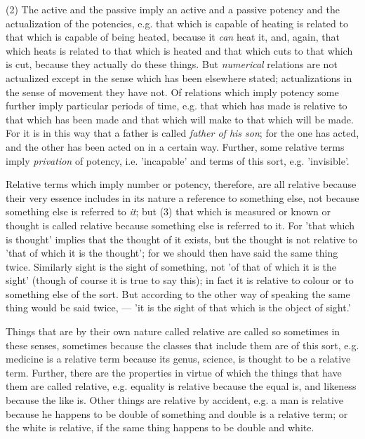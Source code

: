 (2) The active and the passive imply an active and a passive potency and the actualization of the potencies, e.g. that which is capable of heating is related to that which is capable of being heated, because it \emph{can} heat it, and, again, that which heats is related to that which is heated and that which cuts to that which is cut, because they actually do these things. But \emph{numerical} relations are not actualized except in the sense which has been elsewhere stated; actualizations in the sense of movement they have not. Of relations which imply potency some further imply particular periods of time, e.g. that which has made is relative to that which has been made and that which will make to that which will be made. For it is in this way that a father is called \emph{father of his son}; for the one has acted, and the other has been acted on in a certain way. Further, some relative terms imply \emph{privation} of potency, i.e. 'incapable' and terms of this sort, e.g. 'invisible'.

Relative terms which imply number or potency, therefore, are all relative because their very essence includes in its nature a reference to something else, not because something else is referred to \emph{it}; but (3) that which is measured or known or thought is called relative because something else is referred to it. For 'that which is thought' implies that the thought of it exists, but the thought is not relative to 'that of which it is the thought'; for we should then have said the same thing twice. Similarly sight is the sight of something, not 'of that of which it is the sight' (though of course it is true to say this); in fact it is relative to colour or to something else of the sort. But according to the other way of speaking the same thing would be said twice, — 'it is the sight of that which is the object of sight.'

Things that are by their own nature called relative are called so sometimes in these senses, sometimes because the classes that include them are of this sort, e.g. medicine is a relative term because its genus, science, is thought to be a relative term. Further, there are the properties in virtue of which the things that have them are called relative, e.g. equality is relative because the equal is, and likeness because the like is. Other things are relative by accident, e.g. a man is relative because he happens to be double of something and double is a relative term; or the white is relative, if the same thing happens to be double and white.

